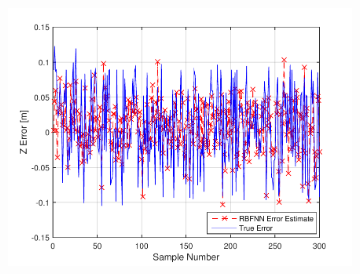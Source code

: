 \begin{figure}
\begin{subfigure}{0.3\textwidth}
    \caption{}
  \end{subfigure}
~
  \begin{subfigure}{0.3\textwidth}
    \includegraphics[width=\textwidth]{figures/chapter4/z_train}
    \caption{}
  \end{subfigure}


\end{figure}
